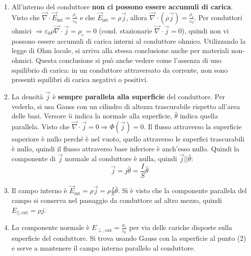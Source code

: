 \documentclass[a4paper]{scrartcl}
\numberwithin{equation}{subsection}
\theoremstyle{style1}
\begin{document}
\begin{enumerate}
	\item All'interno del conduttore \textbf{non ci possono essere accumuli di carica}. Visto che $\vec{\nabla }\cdot \vec{E}_\text{int} = \frac{\rho_c }{\varepsilon _0}$ e che $\vec{E}_\text{int} = \rho  \vec{j}$, allora $\vec{\nabla }\cdot  (\rho \vec{j}) = \frac{\rho _c}{\varepsilon _0}$. Per conduttori ohmici $\Rightarrow \varepsilon _0 \rho \vec{\nabla }\cdot \vec{j} = \rho _c = 0$ (cond. stazionarie $\vec{\nabla }\cdot \vec{j}=0$), quindi non vi possono essere accumuli di carica interni al conduttore ohmico. Utilizzando la legge di Ohm locale, si arriva alla stessa conclusione anche per materiali non-ohmici. Questa conclusione si pu\`o anche vedere come l'assenza di uno squilibrio di carica: in un conduttore attraversato da corrente, non sono presenti squilibri di carica negativi o positivi.

	\item La densit\`a $\vec{j}$ \`e \textbf{sempre parallela alla superficie} del conduttore. Per vederlo, si usa Gauss con un cilindro di altezza trascurabile rispetto all'area delle basi. Versore $\hat{n}$ indica la normale alla superficie, $\hat{\theta }$ indica quella parallela. Visto che $\vec{\nabla }\cdot \vec{j}=0\Rightarrow \Phi(\vec{j}) = 0$. Il flusso attraverso la superficie superiore \`e nullo perch\'e \`e nel vuoto, quello attraverso le superfici trascurabili \`e nullo, quindi il flusso attraverso base inferiore \`e anch'esso nullo. Quindi la componente di $\vec{j}$ normale al conduttore \`e nulla, quindi $\vec{j} ||\hat{\theta }$:
		\begin{equation}
			\vec{j} = j \hat{\theta } = \frac{I}{S}\hat{\theta }
		\end{equation}
	\item Il campo interno \`e $\vec{E}_\text{int}= \rho  \vec{j} = \rho \frac{I}{S}\hat{\theta }$. Si \`e visto che la componente parallela del campo si conserva nel passaggio da conduttore ad altro mezzo, quindi $E_{| |, \text{ext}} = \rho j$.
	\item La componente normale \`e $E_{\perp, \text{ext}} = \frac{\sigma_c}{\varepsilon _0}$ per via delle cariche disposte sulla superficie del conduttore. Si trova usando Gauss con la superficie al punto (2) e serve a mantenere il campo interno parallelo al conduttore.
\end{enumerate}
\end{document}
